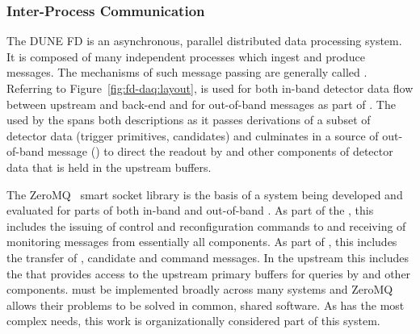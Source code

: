 \subsubsection{Inter-Process Communication}
\label{sec:daq:design-ipc}

The DUNE FD  is an asynchronous, parallel distributed data processing system. 
It is composed of many independent processes which ingest and produce messages. 
The mechanisms of such message passing are generally called . 
Referring to Figure~\ref{fig:fd-daq:layout},  is used for both in-band detector data flow between upstream  and back-end  and for out-of-band messages as part of .  The  used by the  spans both descriptions as it passes derivations of a subset of detector data (trigger primitives, candidates) and culminates in a source of out-of-band message () to direct the readout by  and other components of detector data that is held in the upstream  buffers.

The ZeroMQ~\cite{zeromq} smart socket library is 
the basis of a system being developed and evaluated for parts of both in-band and out-of-band . 
As part of the , this includes the issuing of control and reconfiguration commands to and receiving of monitoring messages from essentially all  components. 
As part of , this includes the transfer of , candidate and command messages. 
In the upstream  this includes the  that  provides access to the upstream  primary buffers for queries by  and other components. 
  must be implemented broadly across many  systems and ZeroMQ allows their problems to be solved in common, shared software.  As  has the most complex   needs, this work is organizationally considered part of this system.


